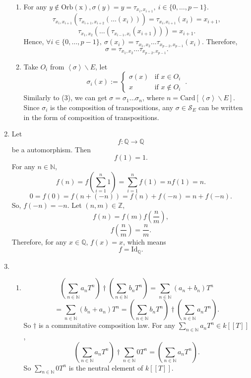 \documentclass{article}
\newcommand{\NN}{\mathbb{N}}
\newcommand{\ZZ}{\mathbb{Z}}
\newcommand{\QQ}{\mathbb{Q}}
\begin{document}
\begin{enumerate}
\begin{enumerate}
            \item For any $y\notin \mathrm{Orb(x)},\sigma(y)=y=\tau_{x_i,x_{i+1}},\ i\in \{0,\dots,p-1\}$.
                $$\tau_{x_i,x_{i+1}}(\tau_{x_{i+1},x_{i+2}}(\dots(x_i)))=\tau_{x_i,x_{i+1}}(x_i)=x_{i+1},$$
                $$\tau_{x_1,x_2}(\dots(\tau_{x_{i-1},x_i}(x_{i+1})))=x_{i+1}.$$
                Hence, $\forall i\in \{0,\dots,p-1\},\ \sigma(x_i)=\tau_{x_1,x_2}\dots \tau_{x_{p-2},x_{p-1}}(x_i).$ Therefore, 
                $$\sigma=\tau_{x_1,x_2}\dots\tau_{x_{p-2},x_{p-1}}.$$
            \item Take $O_i$ from $ \left \langle \sigma \right \rangle \backslash E$, let 
                $$\sigma_i(x):= \left\{ \begin{matrix}
                    \sigma(x) & \text{if } x\in O_i\\
                    x & \text{if } x\notin O_i
                \end{matrix} \ . \right. $$
                Similarly to (3), we can get $\sigma=\sigma_1\dots\sigma_n$, where $n=\mathrm{Card}[\left \langle \sigma \right \rangle \backslash E]$. Since $\sigma_i$ is the composition of transpositions, any $\sigma\in \mathcal{S}_E$ can be written in the form of composition of transpositions.
        \end{enumerate}
\setcounter{enumi}{4}
    \item Let $$f:\QQ\longrightarrow \QQ$$ be a automorphism. Then $$f(1)=1.$$
        For any $n\in\NN$, 
        $$f(n)=f\left(\sum_{i=1}^{n}1\right)=\sum_{i=1}^{n}f(1)=nf(1)=n.$$
        $$0=f(0)=f(n+(-n))=f(n)+f(-n)=n+f(-n).$$
        So, $f(-n)=-n$. Let $(n,m)\in \ZZ$,
        $$f(n)=f(m)f(\frac{n}{m}),$$
        $$f(\frac{n}{m})=\frac{n}{m}.$$
        Therefore, for any $x\in \QQ$, $f(x)=x$, which means 
        $$f=\mathrm{Id}_{\QQ}.$$
\setcounter{enumi}{10}
\item \begin{enumerate}
            \item $$\left(\sum_{n\in \NN}a_nT^n\right)\dagger \left(\sum_{n\in \NN}b_nT^n\right)=\sum_{n\in \NN}(a_n+b_n)T^n$$
            $$=\sum_{n\in \NN}(b_n+a_n)T^n=\left(\sum_{n\in \NN}b_nT^n\right)\dagger\left(\sum_{n\in \NN}a_nT^n\right).$$
            So $\dagger$ is a communitative composition law.
            \newline
            For any $\sum_{n\in \NN}a_nT^n\in k[[T]]$,
            $$\left(\sum_{n\in \NN}a_nT^n\right)\dagger\sum_{n\in \NN}0T^n=\left(\sum_{n\in \NN}a_nT^n\right).$$
            So $\sum_{n\in\NN}0T^n$ is the neutral element of $k[[T]]$.

\end{enumerate}
\end{enumerate}
\end{document}
